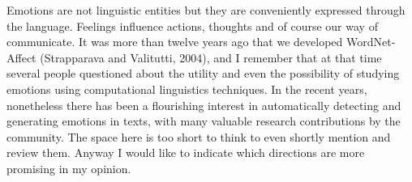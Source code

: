 Emotions are not linguistic entities but they are conveniently expressed through the language. Feelings influence actions, thoughts and of course our way of communicate. It was more than twelve years ago that we developed WordNet-Affect (Strapparava and Valitutti, 2004), and I remember that at that time several people questioned about the utility and even the possibility of studying emotions using computational linguistics techniques. In the recent years, nonetheless there has been a flourishing interest in automatically detecting and generating emotions in texts, with many valuable research contributions by the community. The space here is too short to think to even shortly mention and review them. Anyway I would like to indicate which directions are more promising in my opinion.
